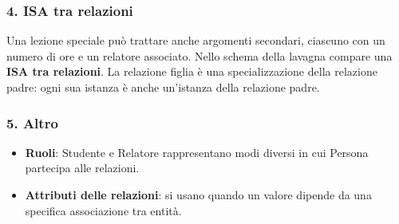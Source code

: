 \subsubsection*{4. ISA tra relazioni}

Una lezione speciale può trattare anche argomenti
secondari, ciascuno con un numero di ore e
un relatore associato.
Nello schema della lavagna compare una
\textbf{ISA tra relazioni}.
La relazione figlia è una specializzazione
della relazione padre: ogni sua istanza
è anche un'istanza della relazione padre.

\subsubsection*{5. Altro}
\begin{itemize}

    \item \textbf{Ruoli}: Studente e Relatore
    rappresentano modi diversi in cui
    Persona partecipa alle relazioni.

    \item \textbf{Attributi delle relazioni}:
    si usano quando un valore dipende
    da una specifica associazione tra entità.
\end{itemize}

